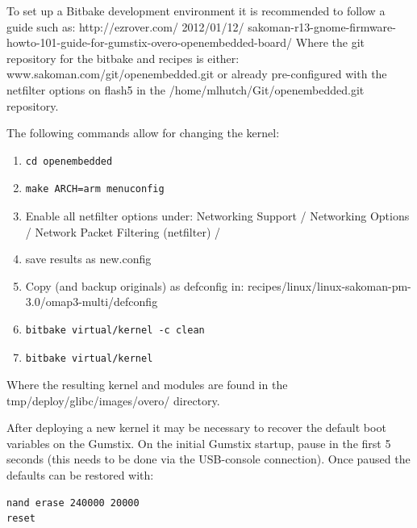 To set up a Bitbake development environment it is recommended to follow a guide such as:
http://ezrover.com/ 2012/01/12/ sakoman-r13-gnome-firmware-howto-101-guide-for-gumstix-overo-openembedded-board/
Where the git repository for the bitbake and recipes is either:
www.sakoman.com/git/openembedded.git
or already pre-configured with the netfilter options on flash5 in the /home/mlhutch/Git/openembedded.git repository.

The following commands allow for changing the kernel:

\begin{enumerate}

\item \begin{verbatim}cd openembedded \end{verbatim}
\item \begin{verbatim}make ARCH=arm menuconfig \end{verbatim}

\item Enable all netfilter options under: Networking Support / Networking Options / Network Packet Filtering (netfilter) /

\item save results as new.config
\item Copy (and backup originals) as defconfig in: recipes/linux/linux-sakoman-pm-3.0/omap3-multi/defconfig

\item \begin{verbatim}bitbake virtual/kernel -c clean \end{verbatim}
\item \begin{verbatim}bitbake virtual/kernel \end{verbatim}

\end{enumerate}

Where the resulting kernel and modules are found in the tmp/deploy/glibc/images/overo/ directory.

After deploying a new kernel it may be necessary to recover the default boot variables on the Gumstix.
On the initial Gumstix startup, pause in the first 5 seconds (this needs to be done via the USB-console connection).
Once paused the defaults can be restored with:

\begin{verbatim}
nand erase 240000 20000
reset
\end{verbatim}

